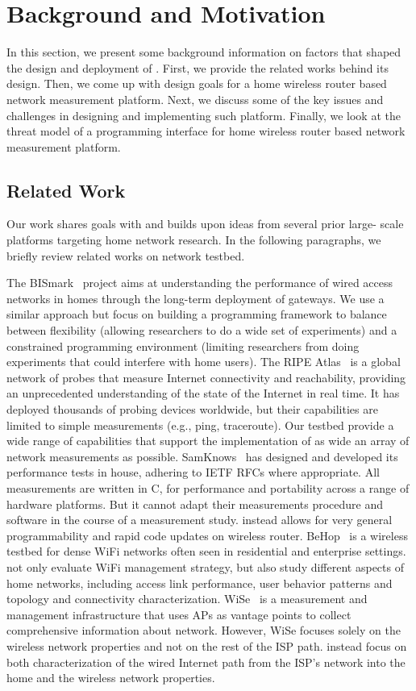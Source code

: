 \section{Background and Motivation}
\label{sec.background_motivation}
In this section, we present some background information on factors that shaped the design and deployment of \sysname. First, we provide the related works behind its design. Then, we come up with design goals for a home wireless router based network measurement platform. Next, we discuss some of the key issues and  challenges in designing and implementing such platform. Finally, we look at the threat model of a programming interface for home wireless router based network measurement platform.

\subsection{Related Work}
\label{ssec.related_work}
Our work shares goals with and builds upon ideas from several prior large-
scale platforms targeting home network research. In the following paragraphs, we briefly review related works on network testbed. 

The BISmark~\cite{183951} project aims at understanding the performance of 
wired access networks in homes through the long-term deployment of gateways. 
We use a similar approach but focus on building a programming framework to 
balance between flexibility (allowing researchers to do a wide set of 
experiments) and a constrained programming environment (limiting researchers 
from doing experiments that could interfere with home users). The RIPE Atlas~\cite{ripeatlas} is a global network of probes that measure Internet 
connectivity and reachability, providing an unprecedented understanding of 
the state of the Internet in real time. It has deployed thousands of probing 
devices worldwide, but their capabilities are limited to simple measurements 
(e.g., ping, traceroute). Our testbed provide a wide range of capabilities 
that support the implementation of as wide an array of network measurements 
as possible. SamKnows~\cite{samknows} has designed and developed its 
performance tests in house, adhering to IETF RFCs where appropriate. All 
measurements are written in C, for performance and portability across a 
range of hardware platforms. But it cannot adapt their measurements 
procedure and software in the course of a measurement study. \sysname instead allows for very general programmability and rapid code updates on wireless router. BeHop~\cite{yiakoumis2014behop} is a wireless testbed for dense WiFi networks often seen in residential and enterprise settings. \sysname not only evaluate WiFi management strategy, but also study different aspects of home networks, including access link performance, user behavior patterns and topology and connectivity characterization. WiSe~\cite{patro2013observing} is a measurement and management infrastructure that uses APs as vantage points to collect comprehensive information about network. However, WiSe focuses solely on the wireless network properties and not on the rest of the ISP path. \sysname instead focus on both characterization of the wired Internet path from the ISP’s network into the home and the wireless network properties.

